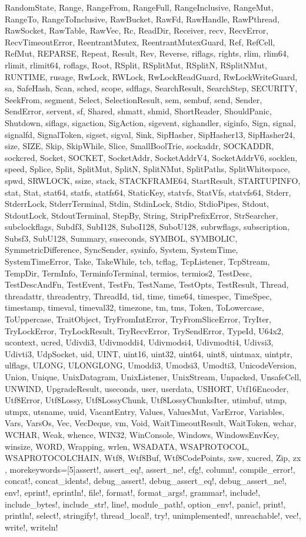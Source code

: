 \documentclass[aspectratio=169]{beamer}
\begin{document}
{{RandomState, Range, RangeFrom, RangeFull, RangeInclusive, RangeMut, RangeTo,
RangeToInclusive, RawBucket, RawFd, RawHandle, RawPthread, RawSocket, RawTable,
RawVec, Rc, ReadDir, Receiver, recv, RecvError, RecvTimeoutError,
ReentrantMutex, ReentrantMutexGuard, Ref, RefCell, RefMut, REPARSE, Repeat,
Result, Rev, Reverse, riflags, rights, rlim, rlim64, rlimit, rlimit64, roflags,
Root, RSplit, RSplitMut, RSplitN, RSplitNMut, RUNTIME, rusage, RwLock, RWLock,
RwLockReadGuard, RwLockWriteGuard, sa, SafeHash, Scan, sched, scope, sdflags,
SearchResult, SearchStep, SECURITY, SeekFrom, segment, Select, SelectionResult,
sem, sembuf, send, Sender, SendError, servent, sf, Shared, shmatt, shmid,
ShortReader, ShouldPanic, Shutdown, siflags, sigaction, SigAction, sigevent,
sighandler, siginfo, Sign, signal, signalfd, SignalToken, sigset, sigval, Sink,
SipHasher, SipHasher13, SipHasher24, size, SIZE, Skip, SkipWhile, Slice,
SmallBoolTrie, sockaddr, SOCKADDR, sockcred, Socket, SOCKET, SocketAddr,
SocketAddrV4, SocketAddrV6, socklen, speed, Splice, Split, SplitMut, SplitN,
SplitNMut, SplitPaths, SplitWhitespace, spwd, SRWLOCK, ssize, stack,
STACKFRAME64, StartResult, STARTUPINFO, stat, Stat, stat64, statfs, statfs64,
StaticKey, statvfs, StatVfs, statvfs64, Stderr, StderrLock, StderrTerminal,
Stdin, StdinLock, Stdio, StdioPipes, Stdout, StdoutLock, StdoutTerminal, StepBy,
String, StripPrefixError, StrSearcher, subclockflags, Subdf3, SubI128, SuboI128,
SuboU128, subrwflags, subscription, Subsf3, SubU128, Summary, suseconds, SYMBOL,
SYMBOLIC, SymmetricDifference, SyncSender, sysinfo, System, SystemTime,
SystemTimeError, Take, TakeWhile, tcb, tcflag, TcpListener, TcpStream, TempDir,
TermInfo, TerminfoTerminal, termios, termios2, TestDesc, TestDescAndFn,
TestEvent, TestFn, TestName, TestOpts, TestResult, Thread, threadattr,
threadentry, ThreadId, tid, time, time64, timespec, TimeSpec, timestamp,
timeval, timeval32, timezone, tm, tms, Token, ToLowercase, ToUppercase,
TraitObject,
TryFromIntError, TryFromSliceError, TryIter, TryLockError, TryLockResult,
TryRecvError, TrySendError, TypeId, U64x2, ucontext, ucred, Udivdi3, Udivmoddi4,
Udivmodsi4, Udivmodti4, Udivsi3, Udivti3, UdpSocket, uid, UINT, uint16, uint32,
uint64, uint8, uintmax, uintptr, ulflags, ULONG, ULONGLONG, Umoddi3, Umodsi3,
Umodti3, UnicodeVersion, Union, Unique, UnixDatagram, UnixListener, UnixStream,
Unpacked, UnsafeCell, UNWIND, UpgradeResult, useconds, user, userdata, USHORT,
Utf16Encoder, Utf8Error, Utf8Lossy, Utf8LossyChunk, Utf8LossyChunksIter,
utimbuf, utmp, utmpx, utsname, uuid, VacantEntry, Values, ValuesMut, VarError,
Variables, Vars, VarsOs, Vec, VecDeque, vm, Void, WaitTimeoutResult, WaitToken,
wchar, WCHAR, Weak, whence, WIN32, WinConsole, Windows, WindowsEnvKey, winsize,
WORD, Wrapping, wrlen, WSADATA, WSAPROTOCOL, WSAPROTOCOLCHAIN, Wtf8, Wtf8Buf,
Wtf8CodePoints, xsw, xucred, Zip, zx}
%
, morekeywords=[5]{assert!, assert_eq!, assert_ne!, cfg!, column!,
compile_error!, concat!, concat_idents!, debug_assert!, debug_assert_eq!,
debug_assert_ne!, env!, eprint!, eprintln!, file!, format!, format_args!,
grammar!,
include!, include_bytes!, include_str!, line!, module_path!, option_env!,
panic!, print!, println!, select!, stringify!, thread_local!, try!,
unimplemented!, unreachable!, vec!, write!, writeln!}  %
}%
\end{document}
